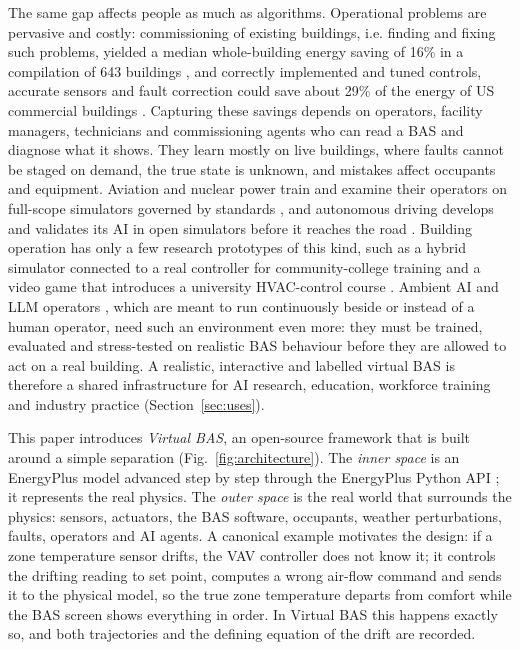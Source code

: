 \documentclass[preprint,12pt,authoryear=false]{elsarticle}
\begin{document}
The same gap affects people as much as algorithms. Operational problems are pervasive and costly: commissioning of
existing buildings, i.e. finding and fixing such problems, yielded a median whole-building energy saving of 16\% in a
compilation of 643 buildings \cite{mills2011commissioning}, and correctly implemented and tuned controls, accurate
sensors and fault correction could save about 29\% of the energy of US commercial buildings
\cite{fernandez2017controls}. Capturing these savings depends on operators, facility managers, technicians and
commissioning agents who can read a BAS and diagnose what it shows. They learn mostly on live buildings, where faults
cannot be staged on demand, the true state is unknown, and mistakes affect occupants and equipment. Aviation and
nuclear power train and examine their operators on full-scope simulators governed by standards \cite{ans35}, and
autonomous driving develops and validates its AI in open simulators before it reaches the road
\cite{dosovitskiy2017carla}. Building operation has only a few research prototypes of this kind, such as a hybrid
simulator connected to a real controller for community-college training \cite{xu2004training} and a video game that
introduces a university HVAC-control course \cite{johra2020geenie}. Ambient AI and LLM operators
\cite{zhang2024llmbem,zhang2024llmcontrol}, which are meant to run continuously beside or instead of a human operator,
need such an environment even more: they must be trained, evaluated and stress-tested on realistic BAS behaviour before
they are allowed to act on a real building. A realistic, interactive and labelled virtual BAS is therefore a shared
infrastructure for AI research, education, workforce training and industry practice (Section~\ref{sec:uses}).

This paper introduces \emph{Virtual BAS}, an open-source framework that is built around a simple separation
(Fig.~\ref{fig:architecture}). The \emph{inner space} is an EnergyPlus model advanced step by step through the
EnergyPlus Python API \cite{energyplusapi}; it represents the real physics. The \emph{outer space} is the real world
that surrounds the physics: sensors, actuators, the BAS software, occupants, weather perturbations, faults, operators
and AI agents. A canonical example motivates the design: if a zone temperature sensor drifts, the VAV controller does
not know it; it controls the drifting reading to set point, computes a wrong air-flow command and sends it to the
physical model, so the true zone temperature departs from comfort while the BAS screen shows everything in order. In
Virtual BAS this happens exactly so, and both trajectories and the defining equation of the drift are recorded.
\end{document}
